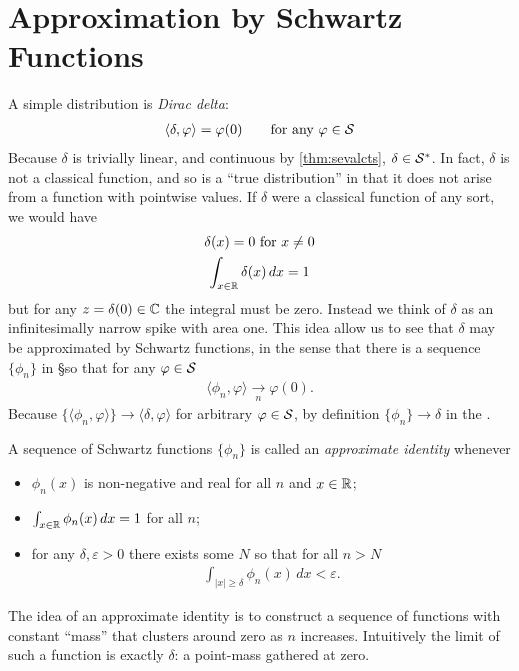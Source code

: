   \section{Approximation by Schwartz Functions}
    A simple distribution is \emph{Dirac delta}:
    \begin{gather*}
      \langle\delta,\varphi\rangle = \varphi(0)
      \qquad\text{for any }\varphi\in\S
    \end{gather*}
    Because $\delta$ is trivially linear, and continuous by \cref{thm:sevalcts}, $\delta\in\SS$.
    In fact, $\delta$ is not a classical function, and so is a ``true distribution'' in that it does not arise from a function with pointwise values.
    If $\delta$ were a classical function of any sort, we would have
    \begin{gather*}
      \delta(x)=0\text{ for }x\ne0\\
      \int_{x\in\R} \delta(x)\,dx = 1
    \end{gather*}
    but for any $z=\delta(0)\in\C$ the integral must be zero.
    Instead we think of $\delta$ as an infinitesimally narrow spike with area one.
    This idea allow us to see that $\delta$ may be approximated by Schwartz functions, in the sense that there is a sequence $\{\phi_n\}$ in \S so that for any $\varphi\in\S$
    \begin{align*}
      \langle \phi_n, \varphi\rangle \underset{n}{\longrightarrow} \varphi(0)\text{.}
    \end{align*}
    Because $\{\langle\phi_n,\varphi\rangle\}\rightarrow\langle\delta,\varphi\rangle$ for arbitrary $\varphi\in\S$, by definition $\{\phi_n\}\rightarrow\delta$ in the \ws.

    \begin{defn}
      A sequence of Schwartz functions $\{\phi_n\}$ is called an \emph{approximate identity} whenever
      \begin{itemize}
        \item $\phi_n(x)$ is non-negative and real for all $n$ and $x\in\R$;
        \item $\int_{x\in\R}\phi_n(x)\,dx=1$ for all $n$;
        \item for any $\delta,\varepsilon>0$ there exists some $N$ so that for all $n>N$ 
          \begin{align*}
            \int_{|x|\ge\delta}\phi_n(x)\,dx < \varepsilon \text{.}
          \end{align*}
      \end{itemize}
    \end{defn}
    The idea of an approximate identity is to construct a sequence of functions with constant ``mass'' that clusters around zero as $n$ increases.
    Intuitively the limit of such a function is exactly $\delta$: a point-mass gathered at zero.

